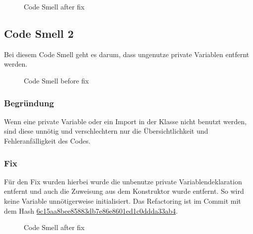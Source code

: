         \begin{figure}[h]
	        \centering
	        \caption{Code Smell  after fix}
        \end{figure}
    
    

    \subsection{Code Smell 2}
    Bei diesem Code Smell geht es darum, dass ungenutze private Variablen entfernt werden.
    \begin{figure}[h]
	    \centering
	    \caption{Code Smell  before fix}
    \end{figure}

        \subsubsection{Begründung}
        Wenn eine private Variable oder ein Import in der Klasse nicht benutzt werden, sind diese unnötig und verschlechtern nur die Übersichtlichkeit und Fehleranfälligkeit des Codes. 

        \subsubsection{Fix}
        Für den Fix wurden hierbei wurde die unbenutze private Variablendeklaration entfernt und auch die Zuweisung aus dem Konstruktor wurde entfernt. So wird keine Variable unnötigerweise initialisiert. Das Refactoring ist im Commit mit dem Hash \href{https://github.com/Krissi005/seriephant/commit/6c15aa8bee85883db7e86e8601ed1c0ddda33ab4}{6c15aa8bee85883db7e86e8601ed1c0ddda33ab4}.
        \begin{figure}[h]
	        \centering
	        \caption{Code Smell  after fix}
        \end{figure}
